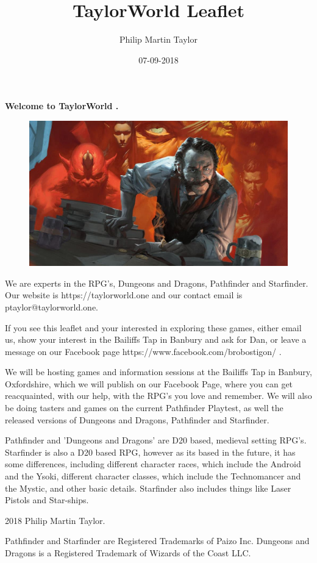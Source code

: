 \documentclass[12pt,a4paper]{book}
\date{07-09-2018}
\author{Philip Martin Taylor}
\title{TaylorWorld Leaflet}
\begin{document}
 
\begin{center} 
\textbf{Welcome to TaylorWorld \texttrademark.} 
\end{center} 
\begin{figure}[h]
  \centering
  \includegraphics[scale=0.15]{alchemist.jpg}
\end{figure}
\begin{flushleft} We are experts in the RPG's, Dungeons and Dragons, Pathfinder and Starfinder. Our website is https://taylorworld.one and our contact email is ptaylor@taylorworld.one. 
\end{flushleft} 
\begin{flushleft}
  If you see this leaflet and your interested in exploring these games, either email us, show your interest in the Bailiffs Tap in Banbury 
and ask for Dan, or leave a message on our Facebook page https://www.facebook.com/brobostigon/ . 
\end{flushleft} 
\begin{flushleft}
 We will be hosting games and information sessions at the Bailiffs Tap in Banbury, Oxfordshire, which we will publish on our Facebook Page, 
where you can get reacquainted, with our help, with the RPG's you love and remember. We will also be doing tasters and games on the current 
Pathfinder Playtest, as well the released versions of Dungeons and Dragons, Pathfinder and Starfinder. 
\end{flushleft} 
\begin{flushleft}
  Pathfinder and 'Dungeons and Dragons' are D20 based, medieval setting RPG's. Starfinder is also a D20 based RPG, however as its based in 
the future, it has some differences, including different character races, which include the Android and the Ysoki, different character 
classes, which include the Technomancer and the Mystic, and other basic details. Starfinder also includes things like Laser Pistols and 
Star-ships. 
\end{flushleft} 
\begin{center}
  \textcopyright{} 2018 Philip Martin Taylor. 
\end{center} 
\begin{center}
  Pathfinder and Starfinder are Registered Trademarks of Paizo Inc. Dungeons and Dragons is a Registered Trademark of Wizards of 
the Coast LLC. 
\end{center}
\end{document}
